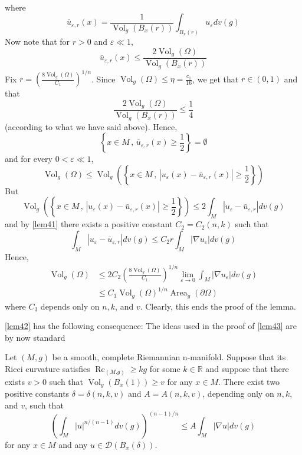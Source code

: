 \documentclass[12pt,hyperref,a4paper,UTF8]{ctexart}
\begin{document}
\begin{Proof}
$$\begin{aligned}
\end{aligned}
$$
where
$$
\bar{u}_{\varepsilon, r}(x)=\frac{1}{\operatorname{Vol}_g\left(B_x(r)\right)} \int_{B_x(r)} u_{\varepsilon} d v(g)
$$
Now note that for $r>0$ and $\varepsilon \ll 1$,
$$
\bar{u}_{\varepsilon, r}(x) \leq \frac{2 \operatorname{Vol}_g(\Omega)}{\operatorname{Vol}_g\left(B_x(r)\right)}
$$
Fix $r=\left(\frac{8 \operatorname{Vol}_g(\Omega)}{C_1}\right)^{1 / n}$. Since $\operatorname{Vol}_g(\Omega) \leq \eta=\frac{c_1}{16}$, we get that $r \in(0,1)$ and that
$$
\frac{2 \operatorname{Vol}_g(\Omega)}{\operatorname{Vol}_g\left(B_x(r)\right)} \leq \frac{1}{4}
$$
(according to what we have said above). Hence,
$$
\left\{x \in M \,,\, \bar{u}_{\varepsilon, r}(x) \geq \frac{1}{2}\right\}=\emptyset
$$
and for every $0<\varepsilon \ll 1$,
$$
\operatorname{Vol}_g(\Omega) \leq \operatorname{Vol}_g\left(\left\{x \in M \,,\,\left|u_{\varepsilon}(x)-\bar{u}_{\varepsilon, r}(x)\right| \geq \frac{1}{2}\right\}\right)
$$
But
$$
\operatorname{Vol}_g\left(\left\{x \in M \,,\,\left|u_{\varepsilon}(x)-\bar{u}_{\varepsilon, r}(x)\right| \geq \frac{1}{2}\right\}\right) \leq 2 \int_M\left|u_{\varepsilon}-\bar{u}_{\varepsilon, r}\right| d v(g)
$$
and by \autoref{lem41} there exists a positive constant $C_2=C_2(n, k)$ such that
$$
\int_M\left|u_{\varepsilon}-\bar{u}_{\varepsilon, r}\right| d v(g) \leq C_2 r \int_M\left|\nabla u_{\varepsilon}\right| d v(g)
$$
Hence,
$$
\begin{aligned}
\operatorname{Vol}_g(\Omega) & \leq 2 C_2\left(\frac{8 \operatorname{Vol}_g(\Omega)}{C_1}\right)^{1 / n} \lim _{\varepsilon \rightarrow 0} \int_M\left|\nabla u_{\varepsilon}\right| d v(g) \\
& \leq C_3 \operatorname{Vol}_g(\Omega)^{1 / n} \operatorname{Area}_g(\partial \Omega)
\end{aligned}
$$
where $C_3$ depends only on $n, k$, and $v$. Clearly, this ends the proof of the lemma.
\end{Proof}

\vskip 3pt
\autoref{lem42} has the following consequence: The ideas used in the proof of \autoref{lem43} are by now standard

\begin{Lemma}
Let $(M, g)$ be a smooth, complete Riemannian n-manifold. Suppose that its Ricci curvature satisfies $\operatorname{Rc}_{(M . g)} \geq k g$ for some $k \in \mathbb{R}$ and suppose that there exists $v>0$ such that $\operatorname{Vol}_g\left(B_x(1)\right) \geq v$ for any $x \in M$. There exist two positive constants $\delta=\delta(n, k, v)$ and $A=A(n, k, v)$, depending only on $n, k$, and $v$, such that
$$
\left(\int_M|u|^{n /(n-1)} d v(g)\right)^{(n-1) / n} \leq A \int_M|\nabla u| d v(g)
$$
for any $x \in M$ and any $u \in \mathcal{D}\left(B_x(\delta)\right)$.
\label{lem43}
\end{Lemma}
\end{document}
